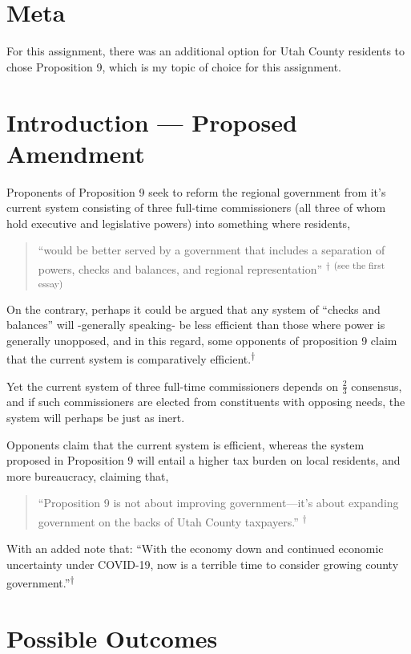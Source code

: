 
\section{Meta}

For this assignment, there was an additional option for Utah County residents to chose Proposition 9, which is my topic of choice for this assignment. 


\section{Introduction — Proposed Amendment}

Proponents of Proposition 9 seek to reform the regional government from it’s current system consisting of three full-time commissioners (all three of whom hold executive and legislative powers) into something where residents,
\begin{quotation}
    ``would be better served by a government that includes a separation of powers, checks and balances, and regional representation'' \textsuperscript{†} \textsuperscript{(see the first essay)}
\end{quotation}

On the contrary, perhaps it could be argued that any system of ``checks and balances'' will -generally speaking- be less efficient than those where power is generally unopposed, and in this regard, some opponents of proposition 9 claim that the current system is comparatively efficient.\textsuperscript{†}

Yet the current system of three full-time commissioners depends on $\frac{2}{3}$ consensus, and if such commissioners are elected from constituents with opposing needs, the system will perhaps be just as inert.

Opponents claim that the current system is efficient, whereas the system proposed in Proposition 9 will entail a higher tax burden on local residents, and more bureaucracy, claiming that, 
\begin{quotation}
    ``Proposition 9 is not about improving government—it’s about expanding government on the backs of Utah County taxpayers.'' \textsuperscript{†} 
\end{quotation}

With an added note that: ``With the economy down and continued economic uncertainty under COVID-19, now is a terrible time to consider growing county government.''\textsuperscript{†} 

\section{Possible Outcomes}

